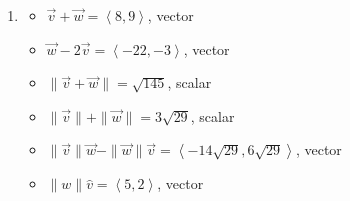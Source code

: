 \documentclass{ximera}
\begin{document}
\begin{enumerate}
\begin{multicols}{2}
\begin{itemize}
\end{itemize}

\end{multicols}

\begin{multicols}{2}

\begin{itemize}

\item $\| \vec{v} \| \vec{w} - \| \vec{w} \| \vec{v}  = \left<-6\sqrt{5},6\sqrt{5}\right>$, vector
\item $\|w\| \hat{v}= \left<4, -2 \right>$, vector

\end{itemize}

\end{multicols}

\item  

\begin{multicols}{2}

\begin{itemize}

\item  $\vec{v} + \vec{w} = \left<8,9\right> $, vector
\item  $\vec{w}  - 2\vec{v}  = \left<-22, -3 \right>$, vector

\end{itemize}

\end{multicols}

\begin{multicols}{2}

\begin{itemize}

\item $\| \vec{v} + \vec{w} \| = \sqrt{145}$, scalar
\item  $\| \vec{v} \| + \| \vec{w}\| = 3\sqrt{29}$, scalar

\end{itemize}

\end{multicols}

\begin{multicols}{2}

\begin{itemize}

\item $\| \vec{v} \| \vec{w} - \| \vec{w} \| \vec{v}  = \left<-14\sqrt{29},6\sqrt{29}\right>$, vector
\item $\|w\| \hat{v}= \left<5, 2 \right>$, vector


\end{itemize}
\end{multicols}
\end{enumerate}
\end{document}

